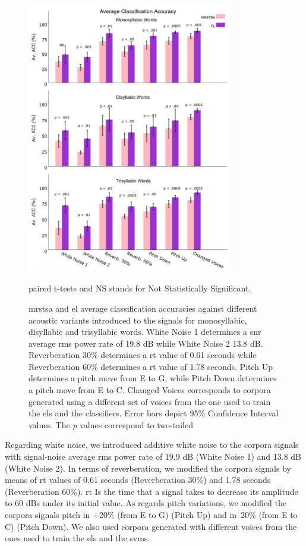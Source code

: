 {\begin{figure}[h!]
    \centering
    \includegraphics[width=0.8\textwidth]{PLOT.png}
    \caption{\gls{mrstsa} and \gls{el} average classification accuracies against different acoustic variants introduced to the signals
    for monosyllabic, disyllabic and trisyllabic words.
    White Noise 1 determines a \gls{snr} average \gls{rms} power rate of 19.8 dB while White Noise 2 13.8 dB.
    Reverberation 30\% determines a \gls{rt} value of 0.61 seconds while Reverberation 60\% determines a \gls{rt} value of 1.78 seconds.
    Pitch Up determines a pitch move from E to G, while Pitch Down determines a pitch move from E to C. Changed Voices corresponds to corpora generated using a different set of voices from the one used to train the \glspl{el} and the classifiers. Error bars depict 95\% Confidence Interval values. The \emph{p} values correspond to two-tailed} paired t-tests and NS stands for Not Statistically Significant.
    \label{fig:PLOT}
\end{figure}

Regarding white noise, we introduced additive white noise to the corpora signals with signal-noise average \gls{rms} power rate of 19.9 dB (White Noise 1) and 13.8 dB (White Noise 2). In terms of reverberation, we modified the corpora signals by means of \gls{rt} values of 0.61 seconds (Reverberation 30\%) and 1.78 seconds (Reverberation 60\%). \gls{rt} Is the time that a signal takes to decrease its amplitude to 60 dBs under its initial value. As regards pitch variations, we modified the corpora signals pitch in +20\% (from E to G) (Pitch Up) and in--20\% (from E to C) (Pitch Down). We also used corpora generated with different voices from the ones used to train the \glspl{el} and the \glspl{svm}.

}
